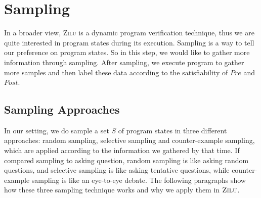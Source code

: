 
\section{Sampling} %
\label{sec:sampling}
In a broader view, \textsc{Zilu} is a dynamic program verification technique, 
thus we are quite interested in program states during its execution.
Sampling is a way to tell our preference on program states. 
So in this step, we would like to gather more information through sampling.
After sampling, we execute program to gather more samples and then label these data according to the satisfiability of $Pre$ and $Post$.

\subsection{Sampling Approaches}
In our setting, we do sample a set $S$ of program states in three different approaches: 
random sampling, selective sampling and counter-example sampling, 
which are applied according to the information we gathered by that time.
If compared sampling to asking question, random sampling is like asking random questions,
and selective sampling is like asking tentative questions, 
while counter-example sampling is like an eye-to-eye debate.
The following paragraphs show how these three sampling technique works and why we apply them in $\textsc{Zilu}$.


